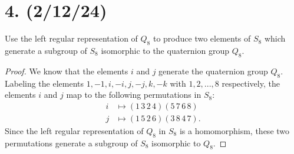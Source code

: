 \documentclass{article}
\begin{document}
\section*{4. (2/12/24)}

Use the left regular representation of $Q_8$ to produce two elements of $S_8$ which generate a subgroup of $S_8$ isomorphic to the quaternion group $Q_8$.

\begin{proof}
    We know that the elements $i$ and $j$ generate the quaternion group $Q_8$. Labeling the elements $1, -1, i, -i, j, -j, k, -k$ with $1, 2, ..., 8$ respectively, the elements $i$ and $j$ map to the following permutations in $S_8$:
    \begin{align*}
        i &\mapsto (1\,3\,2\,4)(5\,7\,6\,8) \\
        j &\mapsto (1\,5\,2\,6)(3\,8\,4\,7).
    \end{align*}
    Since the left regular representation of $Q_8$ in $S_8$ is a homomorphism, these two permutations generate a subgroup of $S_8$ isomorphic to $Q_8$.
\end{proof}
\end{document}
